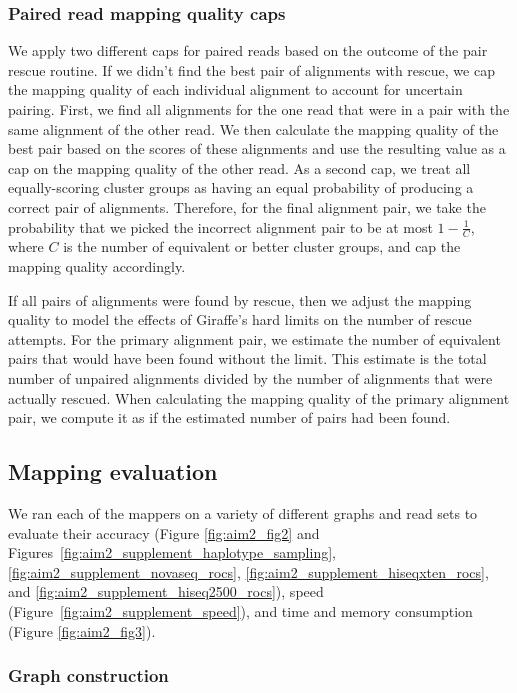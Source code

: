 \documentclass[11pt]{ucscthesis}
\begin{document}
\subsubsection{Paired read mapping quality caps}

We apply two different caps for paired reads based on the outcome of the pair rescue routine.
If we didn't find the best pair of alignments with rescue, we cap the mapping quality of each individual alignment to account for uncertain pairing.
First, we find all alignments for the one read that were in a pair with the same alignment of the other read.
We then calculate the mapping quality of the best pair based on the scores of these alignments and use the resulting value as a cap on the mapping quality of the other read.
As a second cap, we treat all equally-scoring cluster groups as having an equal probability of producing a correct pair of alignments.
Therefore, for the final alignment pair, we take the probability that we picked the incorrect alignment pair to be at most $1 - \frac{1}{C}$, where $C$ is the number of equivalent or better cluster groups, and cap the mapping quality accordingly.


If all pairs of alignments were found by rescue, then we adjust the mapping quality to model the effects of Giraffe's hard limits on the number of rescue attempts.
For the primary alignment pair, we estimate the number of equivalent pairs that would have been found without the limit.
This estimate is the total number of unpaired alignments divided by the number of alignments that were actually rescued.
When calculating the mapping quality of the primary alignment pair, we compute it as if the estimated number of pairs had been found.

\subsection{Mapping evaluation}

We ran each of the mappers on a variety of different graphs and read sets to evaluate their accuracy (Figure \ref{fig:aim2_fig2} and Figures~\ref{fig:aim2_supplement_haplotype_sampling}, \ref{fig:aim2_supplement_novaseq_rocs}, \ref{fig:aim2_supplement_hiseqxten_rocs}, and \ref{fig:aim2_supplement_hiseq2500_rocs}), speed (Figure~\ref{fig:aim2_supplement_speed}), and time and memory consumption (Figure \ref{fig:aim2_fig3}).


\subsubsection{Graph construction}
\label{subsec:aim2:graphconstruction}
\end{document}
